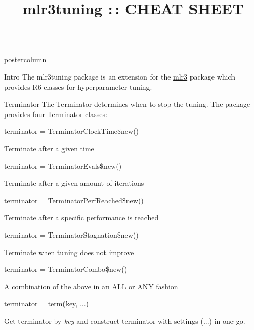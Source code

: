 \documentclass{beamer}
\title{mlr3tuning :\,: CHEAT SHEET} %
\newlength{\columnheight} %
\begin{document}
\begin{frame}[fragile]{}
	\begin{columns}
		\begin{column}{.245\textwidth}
			\begin{beamercolorbox}[center]{postercolumn}
				\begin{minipage}{.98\textwidth}
					\parbox[t][\columnheight]{\textwidth}{
						\begin{myblock}{Intro}
							The mlr3tuning package is an extension for the \href{https://github.com/mlr-org/mlr3}{mlr3} package which provides R6 classes for hyperparameter tuning.
						\end{myblock}
					\begin{myblock}{Terminator}
						The Terminator determines when to stop the tuning. The package provides four Terminator classes:
						\\
						\begin{codebox}
							terminator = TerminatorClockTime\$new()
						\end{codebox}
						Terminate after a given time 
						\\
						\begin{codebox}
							terminator = TerminatorEvals\$new()
						\end{codebox}
						Terminate after a given amount of iterations 
						\\
						\begin{codebox}
							terminator = TerminatorPerfReached\$new()
						\end{codebox}
						Terminate after a specific performance is reached  
						\\
						\begin{codebox}
							terminator = TerminatorStagnation\$new()
						\end{codebox}
						Terminate when tuning does not improve
						\\
						\begin{codebox}
							terminator = TerminatorCombo\$new()
						\end{codebox}
						A combination of the above in an ALL or ANY fashion
						\\
						\begin{codebox}
							terminator = term(key, ...)
						\end{codebox}
						Get terminator by \textit{key} and construct terminator with settings (...) in one go. 
					\end{myblock}	
					\vfill}
				\end{minipage}

\end{beamercolorbox}
\end{column}
\end{columns}
\end{frame}
\end{document}

